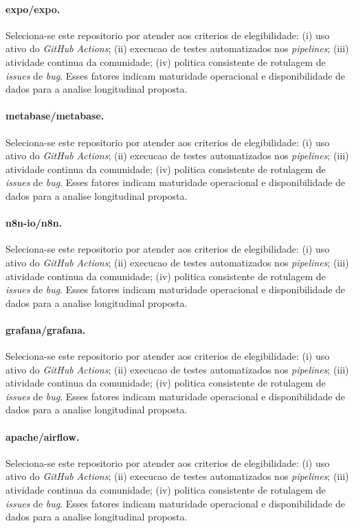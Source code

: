 \paragraph{expo/expo.} Seleciona-se este repositorio por atender aos criterios de elegibilidade: (i) uso ativo do \textit{GitHub Actions}; (ii) execucao de testes automatizados nos \textit{pipelines}; (iii) atividade continua da comunidade; (iv) politica consistente de rotulagem de \textit{issues} de \textit{bug}. Esses fatores indicam maturidade operacional e disponibilidade de dados para a analise longitudinal proposta.
\paragraph{metabase/metabase.} Seleciona-se este repositorio por atender aos criterios de elegibilidade: (i) uso ativo do \textit{GitHub Actions}; (ii) execucao de testes automatizados nos \textit{pipelines}; (iii) atividade continua da comunidade; (iv) politica consistente de rotulagem de \textit{issues} de \textit{bug}. Esses fatores indicam maturidade operacional e disponibilidade de dados para a analise longitudinal proposta.
\paragraph{n8n-io/n8n.} Seleciona-se este repositorio por atender aos criterios de elegibilidade: (i) uso ativo do \textit{GitHub Actions}; (ii) execucao de testes automatizados nos \textit{pipelines}; (iii) atividade continua da comunidade; (iv) politica consistente de rotulagem de \textit{issues} de \textit{bug}. Esses fatores indicam maturidade operacional e disponibilidade de dados para a analise longitudinal proposta.
\paragraph{grafana/grafana.} Seleciona-se este repositorio por atender aos criterios de elegibilidade: (i) uso ativo do \textit{GitHub Actions}; (ii) execucao de testes automatizados nos \textit{pipelines}; (iii) atividade continua da comunidade; (iv) politica consistente de rotulagem de \textit{issues} de \textit{bug}. Esses fatores indicam maturidade operacional e disponibilidade de dados para a analise longitudinal proposta.
\paragraph{apache/airflow.} Seleciona-se este repositorio por atender aos criterios de elegibilidade: (i) uso ativo do \textit{GitHub Actions}; (ii) execucao de testes automatizados nos \textit{pipelines}; (iii) atividade continua da comunidade; (iv) politica consistente de rotulagem de \textit{issues} de \textit{bug}. Esses fatores indicam maturidade operacional e disponibilidade de dados para a analise longitudinal proposta.
